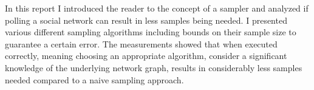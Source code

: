 In this report I introduced the reader to the concept of a sampler and analyzed if polling a social network can result in less samples being needed.
I presented various different sampling algorithms including bounds on their sample size to guarantee a certain error.
The measurements showed that when executed correctly, meaning choosing an appropriate algorithm, consider a significant knowledge of the underlying network graph, results in considerably less samples needed compared to a naive sampling approach.
